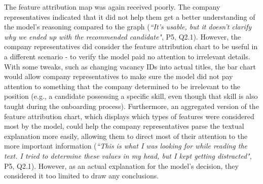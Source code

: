 The feature attribution map was again received poorly. The company representatives indicated that it did not help them get a better understanding of the model's reasoning compared to the graph (\textit{``It's usable, but it doesn't clarify why we ended up with the recommended candidate"}, P5, Q2.1). However, the company representatives did consider the feature attribution chart to be useful in a different scenario - to verify the model paid no attention to irrelevant details. With some tweaks, such as changing vacancy IDs into actual titles, the bar chart would allow company representatives to make sure the model did not pay attention to something that the company determined to be irrelevant to the position (e.g., a candidate possessing a specific skill, even though that skill is also taught during the onboarding process). Furthermore, an aggregated version of the feature attribution chart, which displays which types of features were considered most by the model, could help the company representatives parse the textual explanation more easily, allowing them to direct most of their attention to the more important information (\textit{``This is what I was looking for while reading the text. I tried to determine these values in my head, but I kept getting distracted"}, P5, Q2.1). However, as an actual explanation for the model's decision, they considered it too limited to draw any conclusions.

